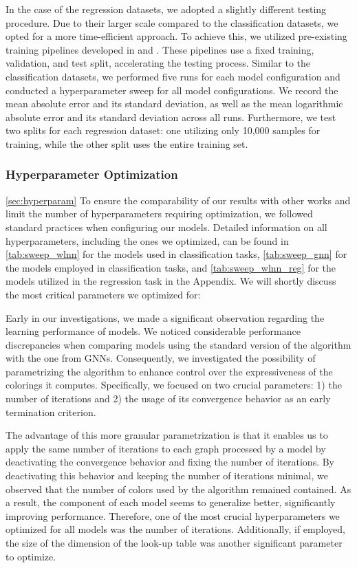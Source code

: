 In the case of the regression datasets, we adopted a slightly different testing procedure. Due to their larger scale compared to the classification datasets, we opted for a more time-efficient approach. To achieve this, we utilized pre-existing training pipelines developed in \cite{Mor+2020} and \cite{Morris2022speqnets}. These pipelines use a fixed training, validation, and test split, accelerating the testing process. Similar to the classification datasets, we performed five runs for each model configuration and conducted a hyperparameter sweep for all model configurations. We record the mean absolute error and its standard deviation, as well as the mean logarithmic absolute error and its standard deviation across all runs. Furthermore, we test two splits for each regression dataset: one utilizing only 10,000 samples for training, while the other split uses the entire training set.

\subsubsection{Hyperparameter Optimization}\cref{sec:hyperparam}
To ensure the comparability of our results with other works and limit the number of hyperparameters requiring optimization, we followed standard practices when configuring our models. Detailed information on all hyperparameters, including the ones we optimized, can be found in \cref{tab:sweep_wlnn} for the \wlnn models used in classification tasks, \cref{tab:sweep_gnn} for the \gnn models employed in classification tasks, and \cref{tab:sweep_wlnn_reg} for the \wlnn models utilized in the regression task in the Appendix. We will shortly discuss the most critical parameters we optimized for:

Early in our investigations, we made a significant observation regarding the learning performance of \wlnn models. We noticed considerable performance discrepancies when comparing \wlnn models using the standard version of the \wl algorithm with the one from GNNs. Consequently, we investigated the possibility of parametrizing the \wl algorithm to enhance control over the expressiveness of the colorings it computes. Specifically, we focused on two crucial parameters: 1) the number of iterations and 2) the usage of its convergence behavior as an early termination criterion.

The advantage of this more granular parametrization is that it enables us to apply the same number of \wl iterations to each graph processed by a \wlnn model by deactivating the convergence behavior and fixing the number of iterations. By deactivating this behavior and keeping the number of iterations minimal, we observed that the number of colors used by the \wl algorithm remained contained. As a result, the \mlp component of each \wlnn model seems to generalize better, significantly improving performance. Therefore, one of the most crucial hyperparameters we optimized for all \wlnn models was the number of \wl iterations. Additionally, if employed, the size of the dimension of the look-up table was another significant parameter to optimize.

